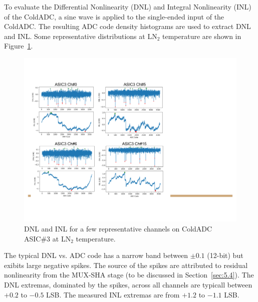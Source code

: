 \label{sec:4.2}


To evaluate the Differential Nonlinearity (DNL) and Integral Nonlinearity (INL) of the ColdADC, a sine wave is applied to the single-ended input of the ColdADC. The resulting ADC code density histograms are used to extract DNL and INL. Some representative distributions at LN$_2$ temperature are shown in Figure~\ref{fig:adc_inldnl}.

\begin{figure}[htb]
\centering
\begin{center}
\includegraphics[width=1.0\textwidth]{figures/ColdADC_StaticLinearity.pdf}
\end{center}
\caption{DNL and INL for a few representative channels on ColdADC ASIC\#3 at LN$_2$ temperature.}
\label{fig:adc_inldnl}
\end{figure}

The typical DNL vs. ADC code has a narrow band between $\pm 0.1$ (12-bit) but exibits large negative spikes. The source of the spikes are attributed to residual nonlinearity from the MUX-SHA stage (to be discussed in Section~\ref{sec:5.4}). The DNL extremas, dominated by the spikes, across all channels are typicall between $+0.2$ to $-0.5$ LSB. The measured INL extremas are from $+1.2$ to $-1.1$ LSB.


